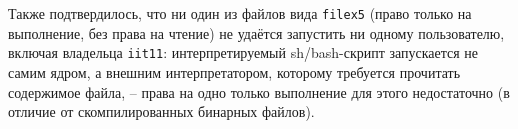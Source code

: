 Также подтвердилось, что ни один из файлов вида \texttt{filex5}
(право только на выполнение, без права на чтение) не удаётся запустить ни
одному пользователю, включая владельца \texttt{iit11}: интерпретируемый
sh/bash-скрипт запускается не самим ядром, а внешним интерпретатором,
которому требуется прочитать содержимое файла, -- права на одно только
выполнение для этого недостаточно (в отличие от скомпилированных
бинарных файлов).

